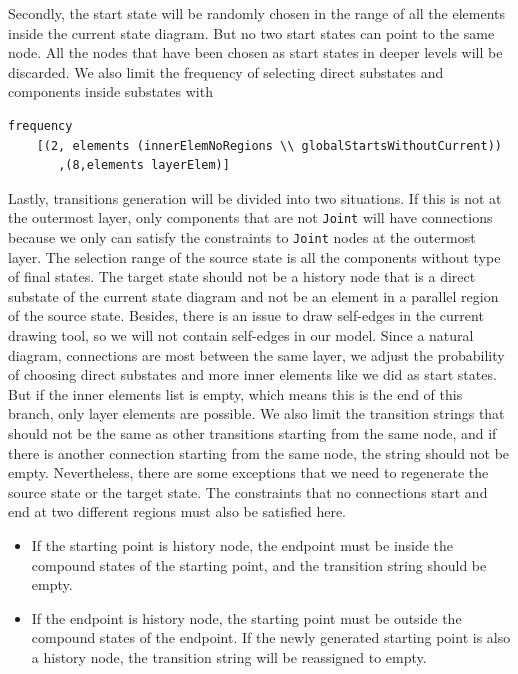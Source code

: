 Secondly, the start state will be randomly chosen in the range of all the elements inside the current state diagram. But no two start states can point to the same node. All the nodes that have been chosen as start states in deeper levels will be discarded. We also limit the frequency of selecting direct substates and components inside substates with 
\begin{verbatim}
frequency 
    [(2, elements (innerElemNoRegions \\ globalStartsWithoutCurrent))
       ,(8,elements layerElem)]
\end{verbatim}
Lastly, transitions generation will be divided into two situations.
If this is not at the outermost layer, only components that are not  \verb|Joint| will have connections because we only can satisfy the constraints to  \verb|Joint| nodes at the outermost layer. 
The selection range of the source state is all the components without type of final states.
The target state should not be a history node that is a direct substate of the current state diagram and not be an element in a parallel region of the source state. 
Besides, there is an issue to draw self-edges in the current drawing tool, so we will not contain self-edges in our model.
Since a natural diagram, connections are most between the same layer, we adjust the probability of choosing direct substates and more inner elements like we did as start states. But if the inner elements list is empty, which means this is the end of this branch, only layer elements are possible.
We also limit the transition strings that should not be the same as other transitions starting from the same node, and if there is another connection starting from the same node, the string should not be empty.
Nevertheless, there are some exceptions that we need to regenerate the source state or the target state. The constraints that no connections start and end at two different regions must also be satisfied here.
\begin{itemize}
\item If the starting point is history node, the endpoint must be inside the compound states of the starting point, and the transition string should be empty.
\end{itemize}
\begin{itemize}
\item If the endpoint is history node, the starting point must be outside the compound states of the endpoint. If the newly generated starting point is also a history node, the transition string will be reassigned to empty.
\end{itemize}


